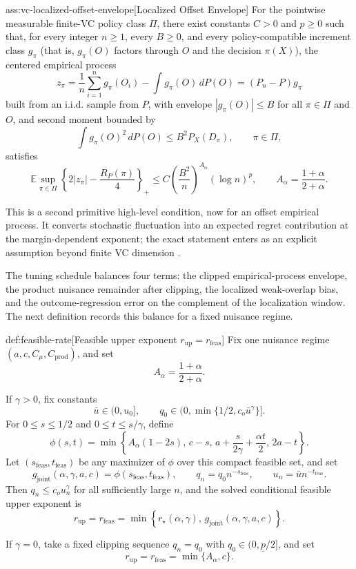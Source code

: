 \begin{assumptionv}{ass:vc-localized-offset-envelope}[Localized Offset Envelope]
For the pointwise measurable finite-VC policy class \(\Pi\), there exist constants \(C>0\) and \(p\ge0\) such that, for every integer \(n\ge1\), every \(B\ge0\), and every policy-compatible increment class \(g_\pi\) (that is, \(g_\pi(O)\) factors through \(O\) and the decision \(\pi(X)\)), the centered empirical process
\[
z_\pi=\frac1n\sum_{i=1}^n g_\pi(O_i)-\int g_\pi(O)\,dP(O)
=(P_n-P)g_\pi
\]
built from an i.i.d. sample from \(P\), with envelope \(|g_\pi(O)|\le B\) for all \(\pi\in\Pi\) and \(O\), and second moment bounded by
\[
\int g_\pi(O)^2\,dP(O)\le B^2 P_X(D_\pi),
\qquad \pi\in\Pi,
\]
satisfies
\[
\mathbb E\sup_{\pi\in\Pi}
\left\{2|z_\pi|-\frac{R_P(\pi)}{4}\right\}_+
\le
C\left(\frac{B^2}{n}\right)^{A_\alpha}(\log n)^p,
\qquad A_\alpha=\frac{1+\alpha}{2+\alpha}.
\]
\end{assumptionv}

This is a second primitive high-level condition, now for an offset empirical process.  It converts stochastic fluctuation into an expected regret contribution at the margin-dependent exponent; the exact statement enters as an explicit assumption beyond finite VC dimension \citep{BartlettBousquetMendelson2005Local}.

The tuning schedule balances four terms: the clipped empirical-process envelope, the product nuisance remainder after clipping, the localized weak-overlap bias, and the outcome-regression error on the complement of the localization window.  The next definition records this balance for a fixed nuisance regime.

\begin{definitionv}{def:feasible-rate}[Feasible upper exponent $r_{\mathrm{up}}=r_{\mathrm{feas}}$]
Fix one nuisance regime \((a,c,C_\mu,C_{\mathrm{prod}})\), and set
\[
A_\alpha=\frac{1+\alpha}{2+\alpha}.
\]

If \(\gamma>0\), fix constants
\[
\bar u\in(0,u_0],
\qquad
q_0\in\bigl(0,\min\{1/2,c_o\bar u^\gamma\}\bigr].
\]
For \(0\le s\le 1/2\) and \(0\le t\le s/\gamma\), define
\[
\phi(s,t)
=
\min\left\{
A_\alpha(1-2s),\,
c-s,\,
a+\frac{s}{2\gamma}+\frac{\alpha t}{2},\,
2a-t
\right\}.
\]
Let \((s_{\mathrm{feas}},t_{\mathrm{feas}})\) be any maximizer of \(\phi\) over this compact feasible set, and set
\[
g_{\mathrm{joint}}(\alpha,\gamma,a,c)
=
\phi(s_{\mathrm{feas}},t_{\mathrm{feas}}),
\qquad
q_n=q_0 n^{-s_{\mathrm{feas}}},
\qquad
u_n=\bar u n^{-t_{\mathrm{feas}}}.
\]
Then \(q_n\le c_o u_n^\gamma\) for all sufficiently large \(n\), and the solved conditional feasible upper exponent is
\[
r_{\mathrm{up}}
=
r_{\mathrm{feas}}
=
\min\left\{r_\star(\alpha,\gamma),\,g_{\mathrm{joint}}(\alpha,\gamma,a,c)\right\}.
\]

If \(\gamma=0\), take a fixed clipping sequence \(q_n=q_0\) with \(q_0\in(0,\underline p/2]\), and set
\[
r_{\mathrm{up}}
=
r_{\mathrm{feas}}
=
\min\{A_\alpha,c\}.
\]
\end{definitionv}

